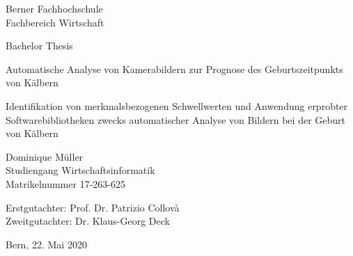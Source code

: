 
\begin{titlepage}
	
	\begin{center}

		\small{Berner Fachhochschule\\
			Fachbereich Wirtschaft\\}
		
		\vspace{0.75cm}
		\large{\textrm{Bachelor Thesis }}
		\vspace{0.75cm}
		
		\Huge{Automatische Analyse von Kamerabildern zur Prognose des Geburtszeitpunkts von Kälbern\\}
		
		\vspace{1cm}
		\LARGE{Identifikation von merkmalsbezogenen Schwellwerten und  Anwendung erprobter Softwarebibliotheken zwecks automatischer Analyse von Bildern bei der Geburt von Kälbern   \\
		\vspace{1.75cm}	
			
			
			\LARGE{Dominique Müller}\\
			\vspace{1cm}
			\large{Studiengang Wirtschaftsinformatik\\
				Matrikelnummer 17-263-625}
			
			\vspace{1cm}
			\large Erstgutachter: Prof. Dr. Patrizio Collovà\\
			\large Zweitgutachter: Dr. Klaus-Georg Deck\\}
			\vspace{1cm}
			
			\large{Bern, 22. Mai 2020} \\

		
		
	\end{center}
	
\end{titlepage}


